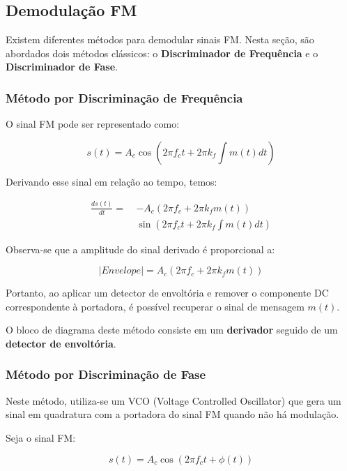 \subsection*{Demodulação FM}

Existem diferentes métodos para demodular sinais FM. Nesta seção, são abordados dois métodos clássicos: o \textbf{Discriminador de Frequência} e o \textbf{Discriminador de Fase}.

\subsubsection*{Método por Discriminação de Frequência}

O sinal FM pode ser representado como:

\begin{equation}
s(t) = A_c \cos\left(2\pi f_c t + 2\pi k_f \int m(t) dt\right)
\end{equation}

Derivando esse sinal em relação ao tempo, temos:

\begin{align}
\frac{ds(t)}{dt} =\ & -A_c \left(2\pi f_c + 2\pi k_f m(t)\right) \\
&  \sin\left(2\pi f_c t + 2\pi k_f \int m(t) dt\right)
\end{align}

Observa-se que a amplitude do sinal derivado é proporcional a:

\begin{equation}
|Envelope| = A_c \left(2\pi f_c + 2\pi k_f m(t)\right)
\end{equation}

Portanto, ao aplicar um detector de envoltória e remover o componente DC correspondente à portadora, é possível recuperar o sinal de mensagem $m(t)$.

O bloco de diagrama deste método consiste em um \textbf{derivador} seguido de um \textbf{detector de envoltória}.

\subsubsection*{Método por Discriminação de Fase}

Neste método, utiliza-se um VCO (Voltage Controlled Oscillator) que gera um sinal em quadratura com a portadora do sinal FM quando não há modulação.

Seja o sinal FM:

\begin{equation}
s(t) = A_c \cos\left(2\pi f_c t + \phi(t)\right)
\end{equation}

